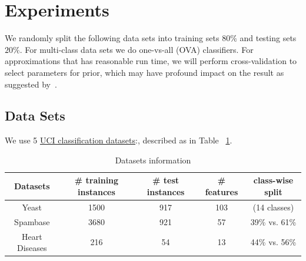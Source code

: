 \section{Experiments}
\label{sec:experiments}

We randomly split the following data sets into training sets $80\%$ and
testing sets $20\%$. For multi-class data sets we do one-vs-all (OVA)
classifiers. For approximations that has reasonable run time, we will perform
cross-validation to select parameters for prior, which may have profound
impact on the result as suggested by~\cite{Asuncion2009smoothing}. 

\subsection{Data Sets}


We use 5 \href{http://archive.ics.uci.edu/ml/datasets.html}{UCI classification
datasets}:, described as in Table ~\ref{tb:datasets}.

\begin{table}
\begin{tabular}{| c | c |  c | c | c |}
  \hline
  Datasets & \# training instances & \# test instances & \# features & class-wise split\\
  \hline
  Yeast & 1500 & 917 & 103 & (14 classes) \\
  \hline
  Spambase & 3680 & 921 & 57 & 39\% vs. 61\% \\
  \hline
  Heart Diseases & 216 & 54 & 13 & 44\% vs. 56\% \\
  \hline
\end{tabular}

\caption{Datasets information}
\label{tb:datasets}
\end{table}

